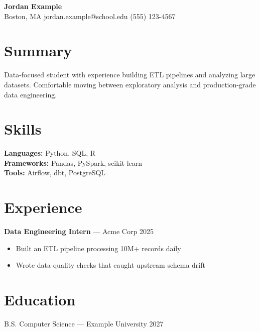 \documentclass[11pt]{article}
\begin{document}
\begin{center}
{\LARGE \textbf{Jordan Example}} \\
Boston, MA \quad jordan.example@school.edu \quad (555) 123-4567
\end{center}

\section*{Summary}
Data-focused student with experience building ETL pipelines and analyzing
large datasets. Comfortable moving between exploratory analysis and
production-grade data engineering.

\section*{Skills}
\textbf{Languages:} Python, SQL, R \\
\textbf{Frameworks:} Pandas, PySpark, scikit-learn \\
\textbf{Tools:} Airflow, dbt, PostgreSQL

\section*{Experience}
\textbf{Data Engineering Intern} --- Acme Corp \hfill 2025 \\
\begin{itemize}[nosep]
  \item Built an ETL pipeline processing 10M+ records daily
  \item Wrote data quality checks that caught upstream schema drift
\end{itemize}

\section*{Education}
B.S. Computer Science --- Example University \hfill 2027
\end{document}
